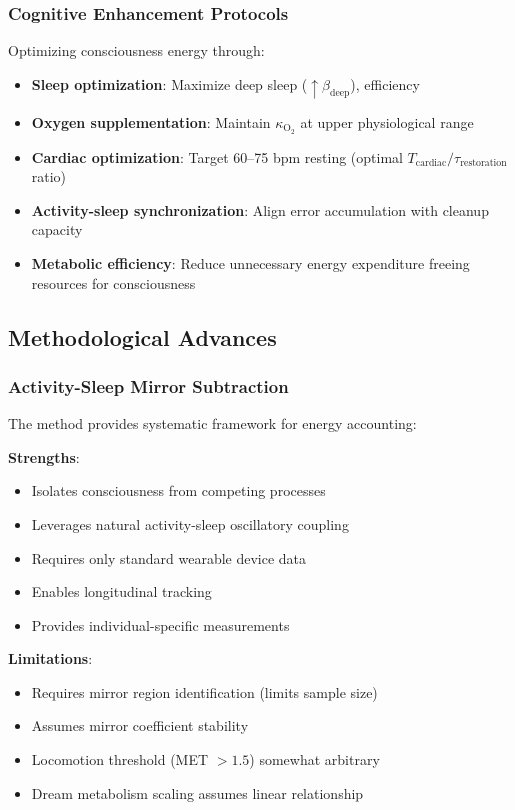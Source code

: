 \documentclass[12pt]{article}
\theoremstyle{remark}
\begin{document}
\subsubsection{Cognitive Enhancement Protocols}

Optimizing consciousness energy through:
\begin{itemize}
\item \textbf{Sleep optimization}: Maximize deep sleep ($\uparrow \beta_{\text{deep}}$), efficiency
\item \textbf{Oxygen supplementation}: Maintain $\kappa_{\text{O}_2}$ at upper physiological range
\item \textbf{Cardiac optimization}: Target 60--75 bpm resting (optimal $T_{\text{cardiac}}/\tau_{\text{restoration}}$ ratio)
\item \textbf{Activity-sleep synchronization}: Align error accumulation with cleanup capacity
\item \textbf{Metabolic efficiency}: Reduce unnecessary energy expenditure freeing resources for consciousness
\end{itemize}

\subsection{Methodological Advances}

\subsubsection{Activity-Sleep Mirror Subtraction}

The method provides systematic framework for energy accounting:

\textbf{Strengths}:
\begin{itemize}
\item Isolates consciousness from competing processes
\item Leverages natural activity-sleep oscillatory coupling
\item Requires only standard wearable device data
\item Enables longitudinal tracking
\item Provides individual-specific measurements
\end{itemize}

\textbf{Limitations}:
\begin{itemize}
\item Requires mirror region identification (limits sample size)
\item Assumes mirror coefficient stability
\item Locomotion threshold (MET $> 1.5$) somewhat arbitrary
\item Dream metabolism scaling assumes linear relationship
\end{itemize}
\end{document}
